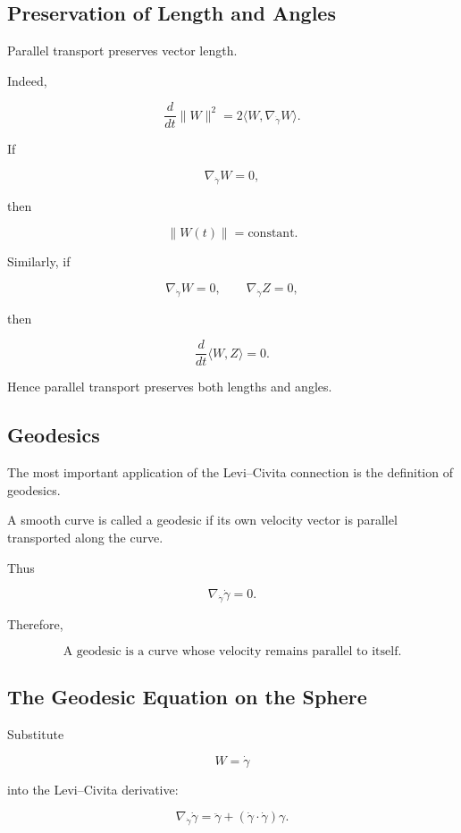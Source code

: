 \documentclass[12pt,a4paper]{article}
\theoremstyle{notespace}
\begin{document}
\subsection{Preservation of Length and Angles}

Parallel transport preserves vector length.

Indeed,

\[
\frac{d}{dt}\|W\|^2
=
2\langle W,\nabla_{\dot\gamma}W\rangle.
\]

If

\[
\nabla_{\dot\gamma}W=0,
\]

then

\[
\boxed{
	\|W(t)\|
	=
	\text{constant}.
}
\]

Similarly, if

\[
\nabla_{\dot\gamma}W
=
0,
\qquad
\nabla_{\dot\gamma}Z
=
0,
\]

then

\[
\frac{d}{dt}
\langle W,Z\rangle
=
0.
\]

Hence parallel transport preserves both lengths and angles.

\subsection{Geodesics}

The most important application of the Levi--Civita connection is the definition
of geodesics.

A smooth curve is called a geodesic if its own velocity vector is parallel
transported along the curve.

Thus

\[
\boxed{
	\nabla_{\dot\gamma}\dot\gamma
	=
	0.
}
\]

Therefore,

\[
\boxed{
	\text{A geodesic is a curve whose velocity remains parallel to itself.}
}
\]

\subsection{The Geodesic Equation on the Sphere}

Substitute

\[
W=\dot\gamma
\]

into the Levi--Civita derivative:

\[
\nabla_{\dot\gamma}\dot\gamma
=
\ddot\gamma
+
(\dot\gamma\cdot\dot\gamma)\gamma.
\]
\end{document}

